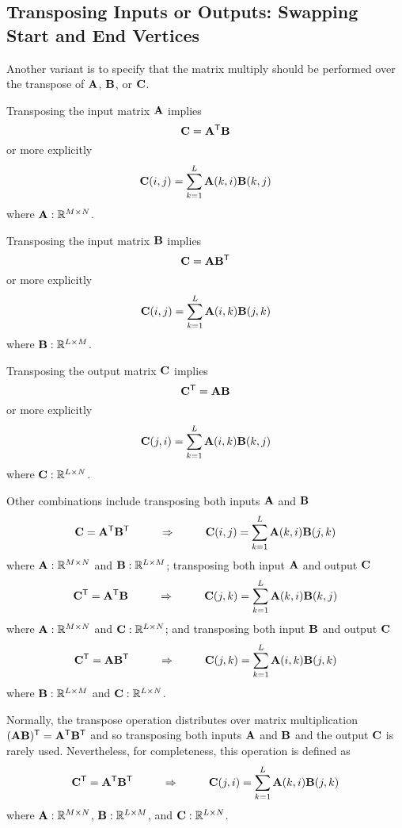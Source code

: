 \subsection{Transposing Inputs or Outputs: Swapping Start and End Vertices}

Another variant is to specify that the matrix multiply should be performed over the transpose of  ${\bf A}$, ${\bf B}$, or ${\bf C}$.

Transposing the input matrix ${\bf A}$ implies
$$
   {\bf C} = {\bf A}^{\sf T} {\bf B}
$$
or more explicitly
$$
   {\bf C}(i,j) = \sum_{k=1}^L {\bf A}(k,i) {\bf B}(k,j)
$$
where ${\bf A}: \mathbb{R}^{M \times N}$.

Transposing the input matrix ${\bf B}$ implies
$$
   {\bf C} = {\bf A} {\bf B}^{\sf T}
$$
or more explicitly
$$
   {\bf C}(i,j) = \sum_{k=1}^L {\bf A}(i,k) {\bf B}(j,k)
$$
where ${\bf B}: \mathbb{R}^{L \times M}$.


Transposing the output matrix ${\bf C}$ implies
$$
   {\bf C}^{\sf T} = {\bf A} {\bf B}
$$
or more explicitly
$$
   {\bf C}(j,i) = \sum_{k=1}^L {\bf A}(i,k) {\bf B}(k,j)
$$
where ${\bf C}: \mathbb{R}^{L \times N}$.

Other combinations include transposing both inputs ${\bf A}$ and ${\bf B}$
$$
   {\bf C} = {\bf A}^{\sf T} {\bf B}^{\sf T} ~~~~~~~~ \Rightarrow ~~~~~~~~ {\bf C}(i,j) = \sum_{k=1}^L {\bf A}(k,i) {\bf B}(j,k)
$$
where ${\bf A}: \mathbb{R}^{M \times N}$ and ${\bf B}: \mathbb{R}^{L \times M}$; transposing both input ${\bf A}$ and output ${\bf C}$
$$
   {\bf C}^{\sf T} = {\bf A}^{\sf T} {\bf B} ~~~~~~~~ \Rightarrow ~~~~~~~~ {\bf C}(j,k) = \sum_{k=1}^L {\bf A}(k,i) {\bf B}(k,j)
$$
where ${\bf A}: \mathbb{R}^{M \times N}$ and ${\bf C}: \mathbb{R}^{L \times N}$; and transposing both input ${\bf B}$ and output ${\bf C}$
$$
   {\bf C}^{\sf T} = {\bf A} {\bf B}^{\sf T} ~~~~~~~~ \Rightarrow ~~~~~~~~ {\bf C}(j,k) = \sum_{k=1}^L {\bf A}(i,k) {\bf B}(j,k)
$$
where ${\bf B}: \mathbb{R}^{L \times M}$ and ${\bf C}: \mathbb{R}^{L \times N}$.

Normally, the transpose operation distributes over matrix multiplication $({\bf A} {\bf B})^{\sf T} ={\bf A}^{\sf T} {\bf B}^{\sf T}$ and so transposing both inputs ${\bf A}$ and ${\bf B}$ and the output ${\bf C}$ is rarely used.  Nevertheless, for completeness, this operation is defined as
$$
   {\bf C}^{\sf T} = {\bf A}^{\sf T} {\bf B}^{\sf T} ~~~~~~~~ \Rightarrow ~~~~~~~~ {\bf C}(j,i) = \sum_{k=1}^L {\bf A}(k,i) {\bf B}(j,k)
$$
where ${\bf A}: \mathbb{R}^{M \times N}$, ${\bf B}: \mathbb{R}^{L \times M}$, and ${\bf C}: \mathbb{R}^{L \times N}$.

